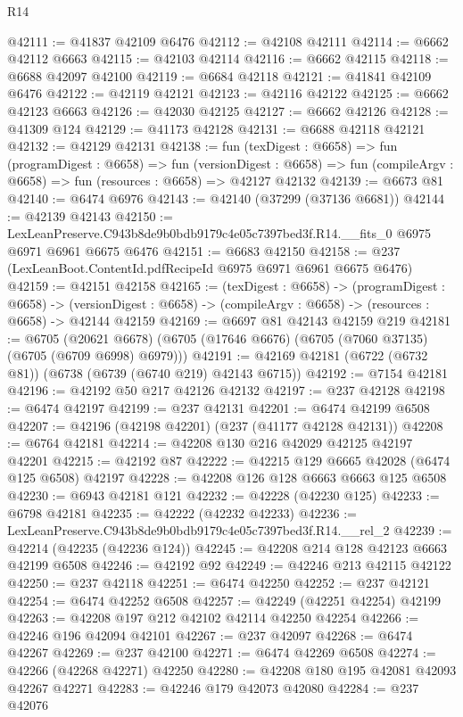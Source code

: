 \begin{lexlean}{R14}
\begin{coremodule}
@42111 := @41837 @42109 @6476
@42112 := @42108 @42111
@42114 := @6662 @42112 @6663
@42115 := @42103 @42114
@42116 := @6662 @42115
@42118 := @6688 @42097 @42100
@42119 := @6684 @42118
@42121 := @41841 @42109 @6476
@42122 := @42119 @42121
@42123 := @42116 @42122
@42125 := @6662 @42123 @6663
@42126 := @42030 @42125
@42127 := @6662 @42126
@42128 := @41309 @124
@42129 := @41173 @42128
@42131 := @6688 @42118 @42121
@42132 := @42129 @42131
@42138 := fun (texDigest : @6658) =>
  fun (programDigest : @6658) =>
  fun (versionDigest : @6658) =>
  fun (compileArgv : @6658) => fun (resources : @6658) => @42127 @42132
@42139 := @6673 @81
@42140 := @6474 @6976
@42143 := @42140 (@37299 (@37136 @6681))
@42144 := @42139 @42143
@42150 := LexLeanPreserve.C943b8de9b0bdb9179c4e05c7397bed3f.R14.__fits_0
    @6975
    @6971
    @6961
    @6675
    @6476
@42151 := @6683 @42150
@42158 := @237 (LexLeanBoot.ContentId.pdfRecipeId @6975 @6971 @6961 @6675 @6476)
@42159 := @42151 @42158
@42165 := (texDigest : @6658) ->
  (programDigest : @6658) ->
  (versionDigest : @6658) -> (compileArgv : @6658) -> (resources : @6658) -> @42144 @42159
@42169 := @6697 @81 @42143 @42159 @219
@42181 := @6705
    (@20621 @6678)
    (@6705 (@17646 @6676) (@6705 (@7060 @37135) (@6705 (@6709 @6998) @6979)))
@42191 := @42169 @42181 (@6722 (@6732 @81)) (@6738 (@6739 (@6740 @219) @42143 @6715))
@42192 := @7154 @42181
@42196 := @42192 @50 @217 @42126 @42132
@42197 := @237 @42128
@42198 := @6474 @42197
@42199 := @237 @42131
@42201 := @6474 @42199 @6508
@42207 := @42196 (@42198 @42201) (@237 (@41177 @42128 @42131))
@42208 := @6764 @42181
@42214 := @42208 @130 @216 @42029 @42125 @42197 @42201
@42215 := @42192 @87
@42222 := @42215 @129 @6665 @42028 (@6474 @125 @6508) @42197
@42228 := @42208 @126 @128 @6663 @6663 @125 @6508
@42230 := @6943 @42181 @121
@42232 := @42228 (@42230 @125)
@42233 := @6798 @42181
@42235 := @42222 (@42232 @42233)
@42236 := LexLeanPreserve.C943b8de9b0bdb9179c4e05c7397bed3f.R14.__rel_2
@42239 := @42214 (@42235 (@42236 @124))
@42245 := @42208 @214 @128 @42123 @6663 @42199 @6508
@42246 := @42192 @92
@42249 := @42246 @213 @42115 @42122
@42250 := @237 @42118
@42251 := @6474 @42250
@42252 := @237 @42121
@42254 := @6474 @42252 @6508
@42257 := @42249 (@42251 @42254) @42199
@42263 := @42208 @197 @212 @42102 @42114 @42250 @42254
@42266 := @42246 @196 @42094 @42101
@42267 := @237 @42097
@42268 := @6474 @42267
@42269 := @237 @42100
@42271 := @6474 @42269 @6508
@42274 := @42266 (@42268 @42271) @42250
@42280 := @42208 @180 @195 @42081 @42093 @42267 @42271
@42283 := @42246 @179 @42073 @42080
@42284 := @237 @42076

\end{coremodule}
\end{lexlean}
